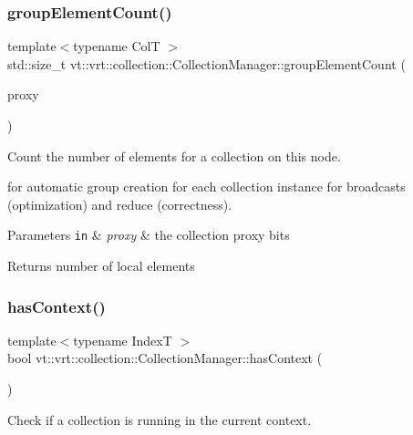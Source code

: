 \subsubsection{\texorpdfstring{group\+Element\+Count()}{groupElementCount()}}
{\footnotesize\ttfamily template$<$typename ColT $>$ \\
std\+::size\+\_\+t vt\+::vrt\+::collection\+::\+Collection\+Manager\+::group\+Element\+Count (\begin{DoxyParamCaption}\item[{\hyperlink{namespacevt_a1b417dd5d684f045bb58a0ede70045ac}{Virtual\+Proxy\+Type} const \&}]{proxy }\end{DoxyParamCaption})}



Count the number of elements for a collection on this node. 

for automatic group creation for each collection instance for broadcasts (optimization) and reduce (correctness).


\begin{DoxyParams}[1]{Parameters}
\mbox{\tt in}  & {\em proxy} & the collection proxy bits\\
\hline
\end{DoxyParams}
\begin{DoxyReturn}{Returns}
number of local elements 
\end{DoxyReturn}
\mbox{\label{structvt_1_1vrt_1_1collection_1_1_collection_manager_ad94808d98e429e50376a9d1b35de57ee}} 
\subsubsection{\texorpdfstring{has\+Context()}{hasContext()}}
{\footnotesize\ttfamily template$<$typename IndexT $>$ \\
bool vt\+::vrt\+::collection\+::\+Collection\+Manager\+::has\+Context (\begin{DoxyParamCaption}{ }\end{DoxyParamCaption})\hspace{0.3cm}{\ttfamily [static]}}



Check if a collection is running in the current context. 

